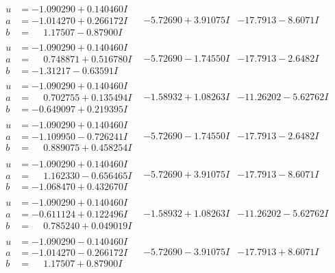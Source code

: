 \documentclass[1p]{elsarticle_modified}
\theoremstyle{definition}
\begin{document}
$$\begin{array}{c|c|c}
\begin{aligned}
u &= -1.090290 + 0.140460 I \\
a &= -1.014270 + 0.266172 I \\
b &= \phantom{-}1.17507 - 0.87900 I\end{aligned}
 & -5.72690 + 3.91075 I & -17.7913 - 8.6071 I \\ \hline\begin{aligned}
u &= -1.090290 + 0.140460 I \\
a &= \phantom{-}0.748871 + 0.516780 I \\
b &= -1.31217 - 0.63591 I\end{aligned}
 & -5.72690 - 1.74550 I & -17.7913 - 2.6482 I \\ \hline\begin{aligned}
u &= -1.090290 + 0.140460 I \\
a &= \phantom{-}0.702755 + 0.135494 I \\
b &= -0.649097 + 0.219395 I\end{aligned}
 & -1.58932 + 1.08263 I & -11.26202 - 5.62762 I \\ \hline\begin{aligned}
u &= -1.090290 + 0.140460 I \\
a &= -1.109950 - 0.726241 I \\
b &= \phantom{-}0.889075 + 0.458254 I\end{aligned}
 & -5.72690 - 1.74550 I & -17.7913 - 2.6482 I \\ \hline\begin{aligned}
u &= -1.090290 + 0.140460 I \\
a &= \phantom{-}1.162330 - 0.656465 I \\
b &= -1.068470 + 0.432670 I\end{aligned}
 & -5.72690 + 3.91075 I & -17.7913 - 8.6071 I \\ \hline\begin{aligned}
u &= -1.090290 + 0.140460 I \\
a &= -0.611124 + 0.122496 I \\
b &= \phantom{-}0.785240 + 0.049019 I\end{aligned}
 & -1.58932 + 1.08263 I & -11.26202 - 5.62762 I \\ \hline\begin{aligned}
u &= -1.090290 - 0.140460 I \\
a &= -1.014270 - 0.266172 I \\
b &= \phantom{-}1.17507 + 0.87900 I\end{aligned}
 & -5.72690 - 3.91075 I & -17.7913 + 8.6071 I \\ \hline\begin{aligned}

\end{aligned}
\end{array}$$
\end{document}
